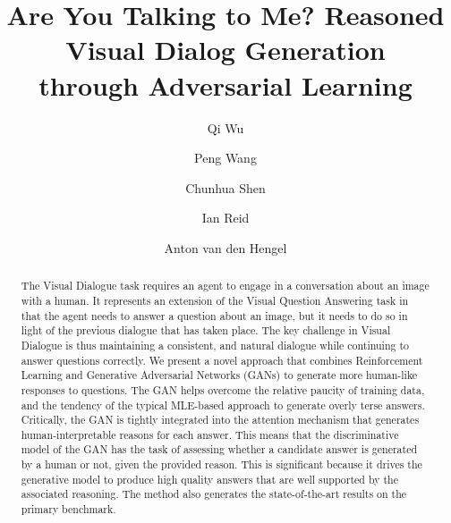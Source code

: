 \documentclass[10pt,twocolumn,letterpaper]{article}
\begin{document}
\title{Are You Talking to Me? Reasoned Visual Dialog Generation \\through Adversarial Learning}

\author[1]{Qi Wu}
\author[2]{Peng Wang}
\author[1]{Chunhua Shen}
\author[1]{Ian Reid}
\author[1]{Anton van den Hengel}

\maketitle


\begin{abstract}
The Visual Dialogue task requires an agent to engage in a conversation about an image with a human.  It represents an extension of the Visual Question Answering task in that the agent needs to answer a question about an image, but it needs to do so in light of the previous dialogue that has taken place.  The key challenge in Visual Dialogue is thus maintaining a consistent, and natural dialogue while continuing to answer questions correctly.  We present a novel approach that combines Reinforcement Learning and Generative Adversarial Networks (GANs) to generate more human-like responses to questions.  The GAN helps overcome the relative paucity of training data, and the tendency of the typical MLE-based approach to generate overly terse answers.  
Critically, the GAN is tightly integrated into the attention mechanism that generates human-interpretable reasons for each answer.  This means that the discriminative model of the GAN has the task of assessing whether a candidate answer is generated by a human or not, given the provided reason.  This is significant because it drives the generative model to produce high quality answers that are well supported by the associated reasoning.
The method also generates the state-of-the-art results on the primary benchmark.
\end{abstract}
\vspace{-10pt}
\end{document}
